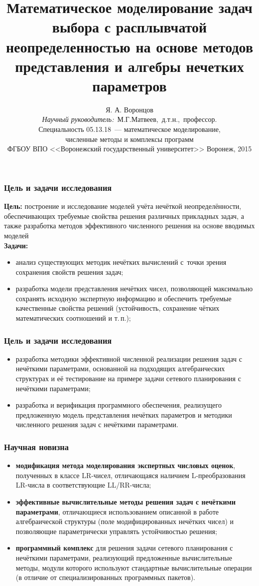 \documentclass[12pt]{beamer}
\title{\Large{Математическое моделирование задач выбора с расплывчатой неопределенностью на основе методов представления и алгебры нечетких параметров}}
\author{\normalsize{%
Я. А. Воронцов\\%
\emph{Научный руководитель:}~М.Г.Матвеев,~д.т.н.,~профессор.}\\%
\small{
\vspace{2pt}
Специальность 05.13.18~--- математическое моделирование,\\ численные методы и комплексы программ \\
\vspace{2pt}
ФГБОУ ВПО <<Воронежский государственный университет>>%
\vspace{10pt}%
}
\small{Воронеж, 2015}
}
\begin{document}
\maketitle

\begin{frame}
  \frametitle{Цель и задачи исследования}
  \textbf{Цель:} построение и исследование моделей учёта нечёткой неопределённости, обеспечивающих требуемые свойства решения различных прикладных задач, а также разработка методов эффективного численного решения на основе вводимых моделей \\
  \textbf{Задачи:}
  \begin{itemize}
    \item анализ существующих методик нечётких вычислений с~точки зрения сохранения свойств решения задач;
    \item разработка модели представления нечётких чисел, позволяющей максимально сохранять исходную экспертную информацию и обеспечить требуемые качественные свойства решений (устойчивость, сохранение чётких математических соотношений и т.\,п.);
  \end{itemize}  
\end{frame}

\begin{frame}
  \frametitle{Цель и задачи исследования}
  \begin{itemize}
    \item разработка методики эффективной численной реализации решения задач с нечёткими параметрами, основанной на подходящих алгебраических структурах и её тестирование на примере задачи сетевого планирования с нечёткими параметрами;
    \item разработка и верификация программного обеспечения, реализущего предложенную модель представления нечётких параметров и методики численного решения задач с нечёткими параметрами.
  \end{itemize}  
\end{frame}


\begin{frame}
  \frametitle{Научная новизна}
  \begin{itemize}
    \item \textbf{модификация метода моделирования экспертных числовых оценок}, полученных в классе LR-чисел, отличающаяся наличием L-преобразования LR-числа в соответствующие LL/RR-числа;
    \item \textbf{эффективные вычислительные методы решения задач с нечёткими параметрами}, отличающиеся использованием описанной в работе алгебраической структуры (поле модифицированных нечётких чисел) и позволяющие параметрически управлять устойчивостью решения;
    \item \textbf{программный комплекс} для решения задачи сетевого планирования с нечёткими параметрами, реализующий предложенные вычислительные методы, модули которого используют стандартные вычислительные операции (в отличие от специализированных программных пакетов).
  \end{itemize}
\end{frame}
\end{document}
